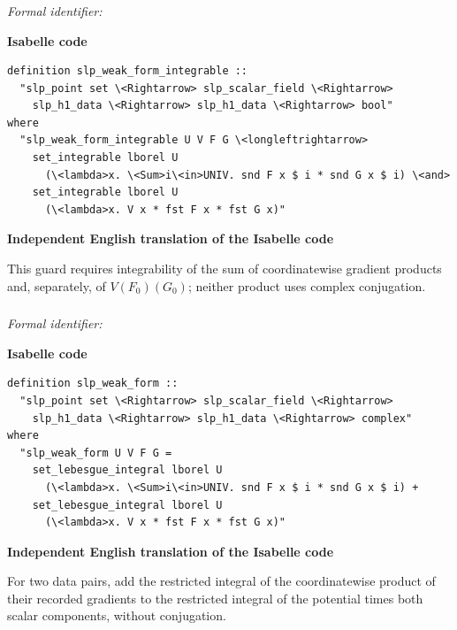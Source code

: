 \documentclass[10pt,oneside]{article}
\newcommand{\reviewlabel}[1]{\par\smallskip\noindent\textsf{\bfseries #1}\par\smallskip}
\begin{document}
\subsubsection{\texttt{}}
\noindent\textit{Formal identifier:} \texttt{}

\reviewlabel{Isabelle code}
\begin{lstlisting}
definition slp_weak_form_integrable ::
  "slp_point set \<Rightarrow> slp_scalar_field \<Rightarrow>
    slp_h1_data \<Rightarrow> slp_h1_data \<Rightarrow> bool"
where
  "slp_weak_form_integrable U V F G \<longleftrightarrow>
    set_integrable lborel U
      (\<lambda>x. \<Sum>i\<in>UNIV. snd F x $ i * snd G x $ i) \<and>
    set_integrable lborel U
      (\<lambda>x. V x * fst F x * fst G x)"
\end{lstlisting}

\reviewlabel{Independent English translation of the Isabelle code}
This guard requires integrability of the sum of coordinatewise gradient products and, separately, of $V(F_0)(G_0)$; neither product uses complex conjugation.

\subsubsection{\texttt{}}
\noindent\textit{Formal identifier:} \texttt{}

\reviewlabel{Isabelle code}
\begin{lstlisting}
definition slp_weak_form ::
  "slp_point set \<Rightarrow> slp_scalar_field \<Rightarrow>
    slp_h1_data \<Rightarrow> slp_h1_data \<Rightarrow> complex"
where
  "slp_weak_form U V F G =
    set_lebesgue_integral lborel U
      (\<lambda>x. \<Sum>i\<in>UNIV. snd F x $ i * snd G x $ i) +
    set_lebesgue_integral lborel U
      (\<lambda>x. V x * fst F x * fst G x)"
\end{lstlisting}

\reviewlabel{Independent English translation of the Isabelle code}
For two data pairs, add the restricted integral of the coordinatewise product of their recorded gradients to the restricted integral of the potential times both scalar components, without conjugation.
\end{document}
